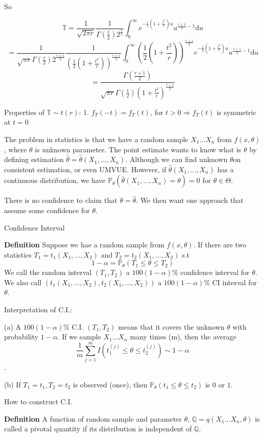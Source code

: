 \documentclass[a4paper,12pt]{article}
\begin{document}
So

$$\mathbb{T} = \frac{1}{\sqrt{2\pi r}} \frac{1}{\Gamma(\frac{r}{2})2^{\frac{r}{2}}}
\int_0^\infty e^{-\frac{1}{2}(1+\frac{t^2}{r})u} u^{\frac{r+1}{2}-1}\mathrm{d}u$$
$$= \frac{1}{\sqrt{\pi r}\Gamma(\frac{r}{2})2^{\frac{r+1}{2}}} \frac{1}{(\frac{1}{2}(1+\frac{t^2}{r}))^{\frac{r+1}{2}}}
\int_0^\infty (\frac{1}{2}(1+\frac{t^2}{r}))^{\frac{r+1}{2}}e^{-\frac{1}{2}(1+\frac{t^2}{r})u} u^{\frac{r+1}{2}-1}\mathrm{d}u$$
$$= \frac{\Gamma(\frac{r+1}{2})}{\sqrt{\pi r}\Gamma(\frac{r}{2})(1+\frac{t^2}{r})^{\frac{r+1}{2}}}$$

Properties of $\mathbb{T}\sim t(r)$: 
1. $ f_T(-t) = f_T(t)$, for $t>0 \Rightarrow f_T(t)$ is symmetric at $t=0$

The problem in statistics is that we have a random sample $X_1 ... X_n$ from $f(x, \theta)$, where $\theta$ is unknown parameter. The point estimate wants to know what is $\theta$ by defining estimation $\hat{\theta} = \hat{\theta}(X_1, ..., X_n)$. Although we can find unknown $\theta$on consistent estimation, or even UMVUE. However, if $\hat{\theta}(X_1, ..., X_n)$ has a continuous distribution, we have $\mathbb{P}_\theta(\hat{\theta}(X_1, ..., X_n) = \theta) = 0$ for $\theta \in \Theta$.

There is no confidence to claim that $\theta = \hat{\theta}$. We then want one approach that assume some confidence for $\theta$.

Confidence Interval

\textbf{Definition} Suppose we hae a random sample from $f(x, \theta)$. If there are two statistics $T_1 = t_1(X_1, ..., X_2)$ and 
$T_2 = t_2(X_1, ..., X_2)$ s.t
$$1-\alpha = \mathbb{P}_\theta(T_1 \leq \theta \leq T_2)$$
We call the random interval $(T_1, T_2)$ a $100(1-\alpha)\%$ confidence interval for $\theta$. We also call $(t_1(X_1, ..., X_2), t_2(X_1, ..., X_2))$ a $100(1-\alpha)\%$ CI interval for $\theta$.

Interpretation of C.I.:


(a) A $100(1-\alpha)\%$ C.I. $(T_1,T_2)$ means that it covers the unknown $\theta$ with probability $1-\alpha$. If we sample $X_1...X_n$ many times (m),
then the average $$\frac{1}{m} \sum_{j=1}^m I(t_1^{(j)} \leq \theta \leq t_2^{(j)}) \sim 1-\alpha$$.

(b) If $T_1 = t_1, T_2 = t_2$ is observed (once),
 then $\mathbb{P}_\theta (t_1 \leq \theta \leq t_2)$ is $0$ or $1$.

How to construct C.I.

\textbf{Definition} A function of random sample and parameter $\theta$,
 $ \mathbb{Q} = q( X_1...X_n, \theta)$ is called a pivotal quantity if its distribution is independent of $\mathbb{Q}$.
 
\end{document}

